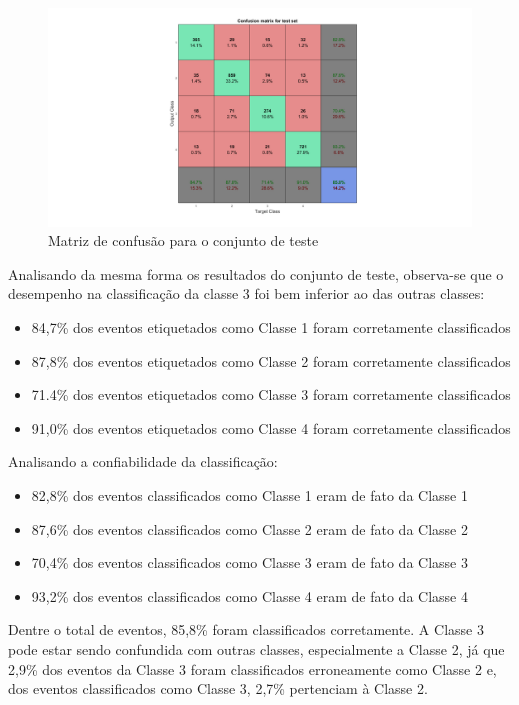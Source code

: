 \documentclass[]{report}
\begin{document}
	\begin{figure}[H]
		\vspace{-4cm}
		\hspace{-5cm}\includegraphics[width=1.8\linewidth]{picts/confusion_test.png}
		\vspace{-1.2cm}\caption{Matriz de confusão para o conjunto de teste}
	\end{figure}
	Analisando da mesma forma os resultados do conjunto de teste, observa-se que o desempenho na classificação da classe 3 foi bem inferior ao das outras classes:
	\begin{itemize}
		\item 84,7\% dos eventos etiquetados como Classe 1 foram corretamente classificados
		\item 87,8\% dos eventos etiquetados como Classe 2 foram corretamente classificados
		\item 71.4\% dos eventos etiquetados como Classe 3 foram corretamente classificados
		\item 91,0\% dos eventos etiquetados como Classe 4 foram corretamente classificados
	\end{itemize}
	Analisando a confiabilidade da classificação:
	\begin{itemize}
		\item 82,8\% dos eventos classificados como Classe 1 eram de fato da Classe 1
		\item 87,6\% dos eventos classificados como Classe 2 eram de fato da Classe 2
		\item 70,4\% dos eventos classificados como Classe 3 eram de fato da Classe 3
		\item 93,2\% dos eventos classificados como Classe 4 eram de fato da Classe 4
	\end{itemize}
	\vspace{0.5cm}
	Dentre o total de eventos, 85,8\% foram classificados corretamente. A Classe 3 pode estar sendo confundida com outras classes, especialmente a Classe 2, já que 2,9\% dos eventos da Classe 3 foram classificados erroneamente como Classe 2 e, dos eventos classificados como Classe 3, 2,7\% pertenciam à Classe 2.
	
\end{document}

